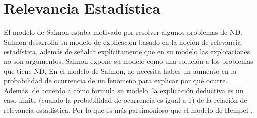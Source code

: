 
\section{Relevancia Estadística}


\noindent El modelo de Salmon estaba motivado por resolver algunos problemas de ND. Salmon desarrolla su modelo de explicación basado en la noción de relevancia estadística, además de señalar explícitamente que en su modelo las explicaciones no son argumentos. Salmon expone su modelo como una solución a los problemas que tiene ND. En el modelo de Salmon, no necesita haber un aumento en la probabilidad de ocurrencia de un fenómeno para explicar por qué ocurre. Además, de acuerdo a cómo formula su modelo, la explicación deductiva es un caso límite (cuando la probabilidad de ocurrencia es igual a 1) de la relación de relevancia estadística. Por lo que es más parsimonioso que el modelo de Hempel \cite{Salmon1970}.

